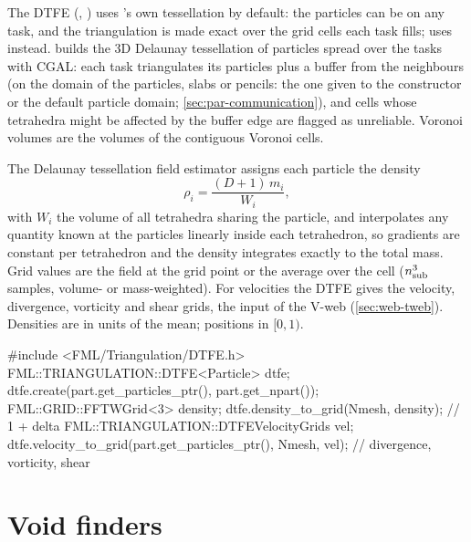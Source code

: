 The DTFE (, ) uses \fml{}'s own tessellation by default: the particles can be on any task, and the
triangulation is made exact over the grid cells each task fills;  uses  instead.
 builds the 3D Delaunay tessellation of particles spread over the tasks with CGAL: each task triangulates its
particles plus a buffer from the neighbours (on the domain of the particles, slabs or pencils: the one given to the constructor or the
default particle domain; \cref{sec:par-communication}), and cells whose tetrahedra might be affected by the
buffer edge are flagged as unreliable. Voronoi volumes are the volumes of the contiguous Voronoi cells.

The Delaunay tessellation field estimator \cite{Schaap2000,Cautun2011} assigns each particle the density
\begin{equation}
\rho_i=\frac{(D+1)\,m_i}{W_i},
\end{equation}
with $W_i$ the volume of all tetrahedra sharing the particle, and interpolates any quantity known at the particles linearly inside each
tetrahedron, so gradients are constant per tetrahedron and the density integrates exactly to the total mass. Grid values are the field at the grid
point or the average over the cell ($n_{\rm sub}^3$ samples, volume- or mass-weighted). For velocities the DTFE gives the velocity, divergence,
vorticity and shear grids, the input of the V-web (\cref{sec:web-tweb}). Densities are in units of the mean; positions in $[0,1)$.

\begin{cppcode}
#include <FML/Triangulation/DTFE.h>
FML::TRIANGULATION::DTFE<Particle> dtfe;
dtfe.create(part.get_particles_ptr(), part.get_npart());
FML::GRID::FFTWGrid<3> density;
dtfe.density_to_grid(Nmesh, density);                    // 1 + delta
FML::TRIANGULATION::DTFEVelocityGrids vel;
dtfe.velocity_to_grid(part.get_particles_ptr(), Nmesh, vel);   // divergence, vorticity, shear
\end{cppcode}

\section{Void finders}\label{sec:voids-finders}

